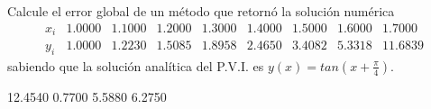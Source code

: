 \begin{pregunta}
\begin{cuerpo}
Calcule el error global de un m\'etodo que retorn\'o la soluci\'on num\'erica 
$$
\begin{array}{c|cccccccc||}
x_i&1.0000    &1.1000   & 1.2000  &  1.3000   & 1.4000  &  1.5000 &     1.6000   & 1.7000 \\ \hline
y_i&1.0000    &1.2230   & 1.5085  &  1.8958   & 2.4650  &  3.4082   &  5.3318 &  11.6839
\end{array}
$$
sabiendo que la soluci\'on anal\'itica del P.V.I. es 
$y(x)=tan\left(x+\frac{\pi}{4}\right)$.
\end{cuerpo}

\begin{multicols}{4}
\begin{alternativas}
{12.4540}
{0.7700}
{5.5880}
{6.2750}
\end{alternativas}
\end{multicols}
\justificacion{5cm}
\end{pregunta}